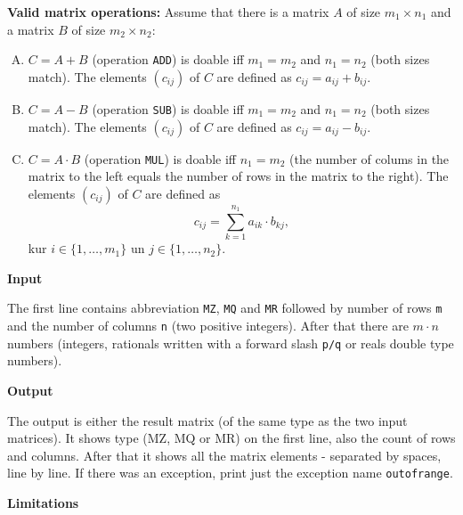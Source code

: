 \documentclass[11pt]{article}
\begin{document}
{\bf Valid matrix operations:} Assume that there is a matrix $A$ of size $m_1 \times n_1$ and
a matrix $B$ of size $m_2 \times n_2$:
\begin{enumerate}[(A)] 
\item
$C = A+B$ (operation {\tt ADD}) is doable iff $m_1 = m_2$ and $n_1 = n_2$ (both sizes match).
The elements $(c_{ij})$ of $C$ are defined as $c_{ij} = a_{ij} + b_{ij}$. 
\item 
$C = A-B$ (operation {\tt SUB}) is doable iff $m_1 = m_2$ and $n_1 = n_2$ (both sizes match).
The elements $(c_{ij})$ of $C$ are defined as $c_{ij} = a_{ij} - b_{ij}$.
\item 
$C = A \cdot B$ (operation {\tt MUL}) is doable iff $n_1 = m_2$ (the number of colums in the 
matrix to the left equals the number of rows in the matrix to the right). 
The elements $(c_{ij})$ of $C$ are defined as
$$c_{ij} = \sum\limits_{k=1}^{n_1} a_{ik}\cdot b_{kj},$$
kur $i \in \{ 1,\ldots,m_1\}$ un $j \in \{ 1,\ldots,n_2\}$.
\end{enumerate}



\vspace{10pt}
{\bf Input}

The first line contains abbreviation {\tt MZ}, {\tt MQ} and {\tt MR} followed by number of 
rows {\tt m} and the number of columns {\tt n} (two positive integers).  
After that there are $m \cdot n$ numbers (integers, rationals written with a 
forward slash {\tt p/q} or reals \textendash{} double type numbers). 

\vspace{10pt}
{\bf Output}

The output is either the result matrix (of the same type as the two input matrices). 
It shows type (MZ, MQ or MR) on the first line, also the count of rows and columns. 
After that it shows all the matrix elements - separated by spaces, line by line. 
If there was an exception, print just the exception name
{\tt out\textunderscore{}of\textunderscore{}range}.



\vspace{10pt}
{\bf Limitations}
\end{document}

